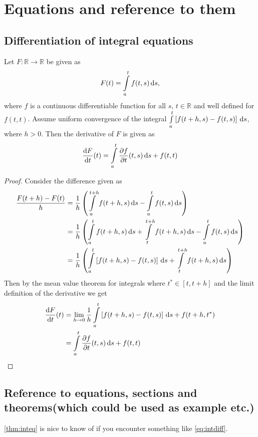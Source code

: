 \section{Equations and reference to them}\label{app:meanDiff}

\subsection{Differentiation of integral equations}\label{sapp:diff}
\begin{theorem}\label{thm:inteq}
Let $ F: \mathbb{R} \rightarrow \mathbb{R} $ be given as
\begin{align}\label{eq:intdiff}
F(t) = \int\limits_{a}^{t} f(t,s)\, \mathrm{d}{s},
\end{align}
where $ f $ is a continuous differentiable function for all $ s,\,t \in \mathbb{R} $ and well defined for $ f(t,t) $. Assume uniform convergence of the integral $ \int\limits_{a}^{t} \left[f(t+h,s) - f(t,s)\right]\, \mathrm{d}{s} $, where $ h > 0 $. Then the derivative of $ F $ is given as
\begin{align*}
\frac{\mathrm{d} F}{\mathrm{d} t}(t) = \int\limits_{a}^{t} {\frac{\partial {f}}{\partial {t}}}(t,s)\, \mathrm{d}{s} + f(t,t)
\end{align*}
\end{theorem}
\begin{proof}
Consider the difference given as
\begin{align*}
\frac{F(t+h) - F(t)}{h} &= \frac{1}{h}\left(\int\limits_{a}^{t+h} f(t+h,s)\, \mathrm{d}{s} - \int\limits_{a}^{t} f(t,s)\, \mathrm{d}{s}\right)\\
&= \frac{1}{h}\left(\int\limits_{a}^{t} f(t+h,s)\, \mathrm{d}{s} + \int\limits_{t}^{t+h} f(t+h,s)\, \mathrm{d}{s} - \int\limits_{a}^{t} f(t,s)\, \mathrm{d}{s}\right)\\
&= \frac{1}{h}\left(\int\limits_{a}^{t} \left[f(t+h,s) - f(t,s)\right]\, \mathrm{d}{s} + \int\limits_{t}^{t+h} f(t+h,s)\, \mathrm{d}{s}\right)\\
\end{align*}
Then by the mean value theorem for integrals where $ t^* \in [t, t+h] $ and the limit definition of the derivative we get
\begin{align*}
\frac{\mathrm{d} F}{\mathrm{d} t}(t) &= \lim\limits_{h \rightarrow 0} \frac{1}{h}\int\limits_{a}^{t} \left[f(t+h,s) - f(t,s)\right]\, \mathrm{d}{s} + f(t+h,t^*)\\
&= \int\limits_{a}^{t} {\frac{\partial {f}}{\partial {t}}}(t,s)\, \mathrm{d}{s} + f(t,t)
\end{align*}
\end{proof}

\subsection{Reference to equations, sections and theorems(which could be used as example etc.)}
\cref{thm:inteq} is nice to know of if you encounter something like \cref{eq:intdiff}.
